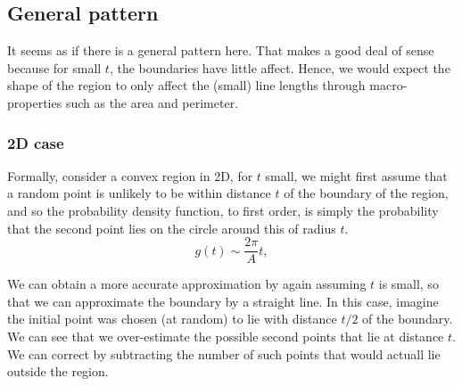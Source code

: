
\subsection{General pattern}

It seems as if there is a general pattern here.  That makes a good
deal of sense because for small $t$, the boundaries have little
affect. Hence, we would expect the shape of the region to only affect
the (small) line lengths through macro-properties such as the area and
perimeter.

\subsubsection{2D case}

Formally, consider a convex region in 2D, for $t$ small, we might
first assume that a random point is unlikely to be within distance $t$
of the boundary of the region, and so the probability density
function, to first order, is simply the probability that the second
point lies on the circle around this of radius $t$.
\begin{equation}
  g(t) \sim \frac{2 \pi}{A} t, 
\end{equation}

We can obtain a more accurate approximation by again assuming $t$ is
small, so that we can approximate the boundary by a straight line. In
this case, imagine the initial point was chosen (at random) to lie
with distance $t/2$ of the boundary. We can see that we over-estimate
the possible second points that lie at distance $t$. We can correct by
subtracting the number of such points that would actuall lie outside
the region.

